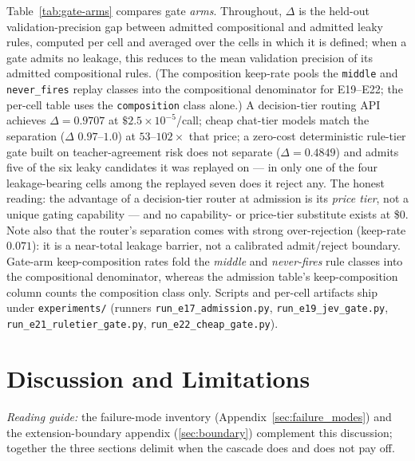 \documentclass[11pt]{article}
\theoremstyle{plain}
\begin{document}
Table~\ref{tab:gate-arms} compares gate \emph{arms}. Throughout, $\Delta$ is
the held-out validation-precision gap between admitted compositional and
admitted leaky rules, computed per cell and averaged over the cells in
which it is defined; when a gate admits no leakage, this reduces to the
mean validation precision of its admitted compositional rules. (The
composition keep-rate pools the \texttt{middle} and \texttt{never\_fires}
replay classes into the compositional denominator for E19--E22; the per-cell
table uses the \texttt{composition} class alone.) A decision-tier routing API
achieves $\Delta=0.9707$ at $\$2.5\times10^{-5}$/call; cheap chat-tier models
match the separation ($\Delta$ $0.97$--$1.0$) at $53$--$102\times$ that price;
a zero-cost deterministic rule-tier gate built on teacher-agreement risk does
not separate ($\Delta=0.4849$) and admits five of the six leaky candidates it was replayed on
--- in only one of the four leakage-bearing cells among the replayed seven
does it reject any. The
honest reading: the advantage of a decision-tier router at admission is its
\emph{price tier}, not a unique gating capability --- and no capability- or
price-tier substitute exists at \$0. Note also that the router's separation
comes with strong over-rejection (keep-rate $0.071$): it is a near-total
leakage barrier, not a calibrated admit/reject boundary. Gate-arm
keep-composition rates fold the \emph{middle} and \emph{never-fires} rule
classes into the compositional denominator, whereas the admission table's
keep-composition column counts the composition class only. Scripts and per-cell
artifacts ship under \texttt{experiments/} (runners \texttt{run\_e17\_admission.py},
\texttt{run\_e19\_jev\_gate.py}, \texttt{run\_e21\_ruletier\_gate.py},
\texttt{run\_e22\_cheap\_gate.py}).

\section{Discussion and Limitations}
\label{sec:limitations}
\noindent\emph{Reading guide:} the failure-mode inventory
(Appendix~\ref{sec:failure_modes}) and the extension-boundary appendix
(\ref{sec:boundary}) complement this discussion; together the three sections
delimit when the cascade does and does not pay off.
\end{document}
